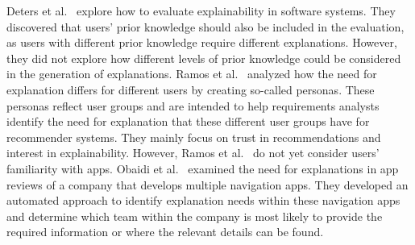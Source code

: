 Deters et al.~\cite{deters2023expl} explore how to evaluate explainability in software systems. 
They discovered that users' prior knowledge should also be included in the evaluation, as users with different prior knowledge require different explanations. However, they did not explore how different levels of prior knowledge could be considered in the generation of explanations.
Ramos et al.~\cite{ramos2021modeling} analyzed how the need for explanation differs for different users by creating so-called personas. These personas reflect user groups and are intended to help requirements analysts identify the need for explanation that these different user groups have for recommender systems. They mainly focus on trust in recommendations and interest in explainability. However, Ramos et al.~\cite{ramos2021modeling} do not yet consider users' familiarity with apps. 
Obaidi et al.~\cite{obaidi2025automatingexplanationneedmanagement} examined the need for explanations in app reviews of a company that develops multiple navigation apps. They developed an automated approach to identify explanation needs within these navigation apps and determine which team within the company is most likely to provide the required information or where the relevant details can be found.